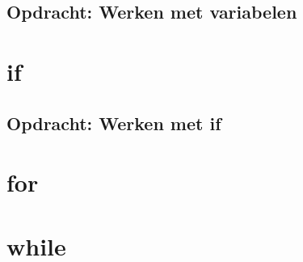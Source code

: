 \documentclass[a4paper,12pt,twoside,openright,titlepage]{book}
\begin{document}
\subsection{Opdracht: Werken met variabelen}

\section{if}

\subsection{Opdracht: Werken met if}

\section{for}
\section{while}


\printindex
\end{document}
